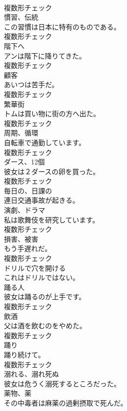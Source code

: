 \documentclass[8pt]{extreport}
\begin{document}
\begin{CJK}{UTF8}{min}
\\	複数形チェック
\\	[名詞]	慣習、伝統	
\\	この習慣は日本に特有のものである。	
\\	複数形チェック
\\	[名詞]	階下へ	
\\	アンは階下に降りてきた。	
\\	複数形チェック
\\	[名詞]	顧客	
\\	あいつは苦手だ。	
\\	複数形チェック
\\	[名詞]	繁華街	
\\	トムは買い物に街の方へ出た。	
\\	複数形チェック
\\	[名詞]	周期、循環	
\\	自転車で通勤しています。	
\\	複数形チェック
\\	[名詞]	ダース、12個	
\\	彼女は２ダースの卵を買った。	
\\	複数形チェック
\\	[形容詞]	毎日の、日課の	
\\	連日交通事故が起きる。	
\\	[名詞]	演劇、ドラマ	
\\	私は歌舞伎を研究しています。	
\\	複数形チェック
\\	[名詞]	損害、被害	
\\	もう手遅れだ。	
\\	複数形チェック
\\	[動詞]	ドリルで穴を開ける	
\\	これはドリルではない。	
\\	[名詞]	踊る人	
\\	彼女は踊るのが上手です。	
\\	複数形チェック
\\	[名詞]	飲酒	
\\	父は酒を飲むのをやめた。	
\\	複数形チェック
\\	[名詞]	踊り	
\\	踊り続けて。	
\\	複数形チェック
\\	[動詞]	溺れる、溺れ死ぬ	
\\	彼女は危うく溺死するところだった。	
\\	[名詞]	薬物、薬	
\\	その中毒者は麻薬の過剰摂取で死んだ。	

\end{CJK}
\end{document}

